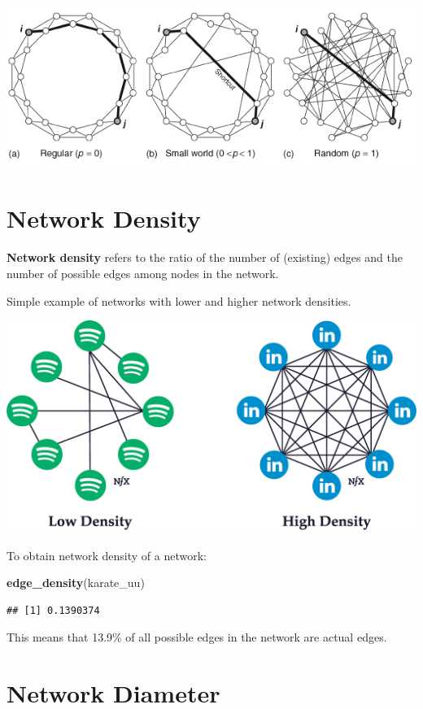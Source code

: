 \documentclass[
]{book}
\newenvironment{Shaded}{\begin{snugshade}}{\end{snugshade}}
\newcommand{\FunctionTok}[1]{\textcolor[rgb]{0.13,0.29,0.53}{\textbf{#1}}}
\newcommand{\NormalTok}[1]{#1}
\begin{document}
\includegraphics{images/small-world.png}

\section{Network Density}\label{network-density}

\textbf{Network density} refers to the ratio of the number of (existing) edges and the number of possible edges among nodes in the network.

Simple example of networks with lower and higher network densities.

\includegraphics{images/density.png}

To obtain network density of a network:

\begin{Shaded}
\begin{Highlighting}[]
\FunctionTok{edge\_density}\NormalTok{(karate\_uu)}
\end{Highlighting}
\end{Shaded}

\begin{verbatim}
## [1] 0.1390374
\end{verbatim}

This means that 13.9\% of all possible edges in the network are actual edges.

\section{Network Diameter}\label{network-diameter}
\end{document}
